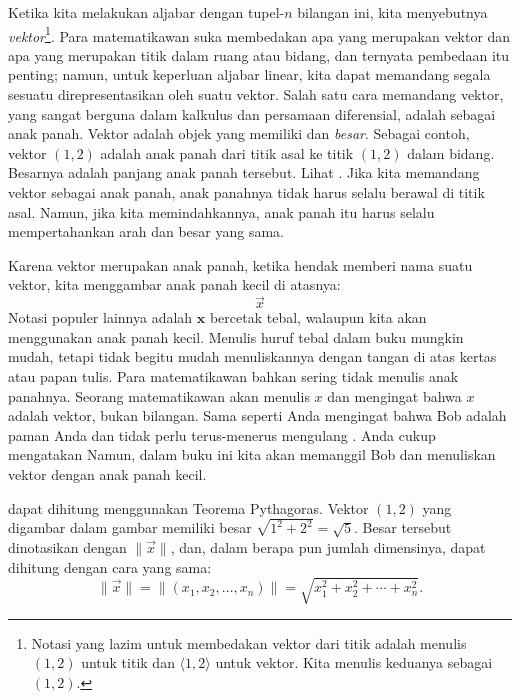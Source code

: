 Ketika kita melakukan aljabar dengan tupel-$n$ bilangan ini, kita menyebutnya
\emph{vektor}\footnote{%
Notasi yang lazim untuk membedakan vektor dari titik adalah menulis $(1,2)$
untuk titik dan $\langle 1,2 \rangle$ untuk vektor. Kita menulis keduanya sebagai
$(1,2)$.}. Para matematikawan suka membedakan
apa yang merupakan vektor dan apa yang merupakan titik dalam ruang atau bidang,
dan ternyata
pembedaan itu penting; namun, untuk keperluan aljabar linear,
kita dapat memandang segala sesuatu direpresentasikan oleh suatu vektor.
Salah satu cara memandang vektor, yang sangat berguna dalam kalkulus
dan persamaan diferensial, adalah sebagai anak panah. Vektor adalah objek yang memiliki
\emph{} dan \emph{besar}.
Sebagai contoh, vektor $(1,2)$
adalah anak panah dari titik asal ke titik $(1,2)$ dalam bidang.
Besarnya adalah panjang anak panah tersebut.
Lihat .
Jika kita memandang vektor sebagai anak panah,
anak panahnya tidak harus selalu berawal di titik asal. Namun, jika kita
memindahkannya, anak panah itu harus selalu mempertahankan arah dan besar yang sama.

\begin{myfig}
\capstart
{}
\caption{Vektor $(1,2)$ digambar sebagai anak panah dari titik asal ke titik
$(1,2)$.\label{linalg-vecarrow:fig}}
\end{myfig}

Karena vektor merupakan anak panah, ketika hendak memberi nama suatu vektor,
kita menggambar anak panah kecil di atasnya:
\begin{equation*}
\vec{x}
\end{equation*}
Notasi populer lainnya adalah $\mathbf{x}$ bercetak tebal, walaupun kita akan menggunakan anak panah
kecil. Menulis huruf tebal dalam buku mungkin mudah, tetapi tidak begitu
mudah menuliskannya dengan tangan di atas kertas atau papan tulis.
Para matematikawan bahkan sering tidak menulis anak panahnya. Seorang matematikawan akan
menulis $x$ dan mengingat bahwa $x$ adalah vektor, bukan bilangan.
Sama seperti Anda mengingat bahwa Bob adalah paman Anda dan tidak perlu
terus-menerus mengulang . Anda cukup mengatakan 
Namun, dalam buku ini kita akan memanggil Bob 
dan menuliskan vektor dengan anak panah kecil.

\emph{} dapat dihitung menggunakan Teorema Pythagoras.
Vektor $(1,2)$ yang digambar dalam gambar memiliki besar $\sqrt{1^2+2^2} =
\sqrt{5}$. Besar tersebut dinotasikan dengan $\lVert \vec{x} \rVert$,
dan, dalam berapa pun jumlah dimensinya, dapat dihitung dengan cara yang sama:
\begin{equation*}
\lVert \vec{x} \rVert
=
\lVert (x_1,x_2,\ldots,x_n) \rVert
=
\sqrt{x_1^2+x_2^2+\cdots+x_n^2} .
\end{equation*}

